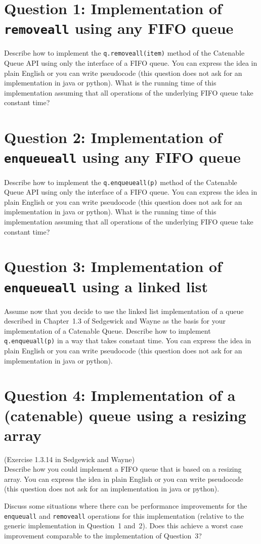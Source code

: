 \documentclass{tufte-handout}
\begin{document}
\section{\textbf{Question 1}: Implementation of \texttt{removeall} using any FIFO queue}

Describe how to implement the \texttt{q.removeall(item)} method of the Catenable Queue API using only the interface of a FIFO queue.
You can express the idea in plain English or you can write pseudocode (this question does not ask for an implementation in java or python).
What is the running time of this implementation assuming that all operations of the underlying FIFO queue take constant time?

\section{\textbf{Question 2}: Implementation of \texttt{enqueueall} using any FIFO queue}

Describe how to implement the \texttt{q.enqueueall(p)} method of the Catenable Queue API using only the interface of a FIFO queue.
You can express the idea in plain English or you can write pseudocode (this question does not ask for an implementation in java or python).
What is the running time of this implementation assuming that all operations of the underlying FIFO queue take constant time?

\section{\textbf{Question 3}: Implementation of \texttt{enqueueall} using a linked list}

Assume now that you decide to use the linked list implementation of a queue described in Chapter~1.3 of Sedgewick and Wayne as the basis for your implementation of a Catenable Queue.
Describe how to implement \texttt{q.enqueuall(p)} in a way that takes constant time.
You can express the idea in plain English or you can write pseudocode (this question does not ask for an implementation in java or python).

\section{\textbf{Question 4}: Implementation of a (catenable) queue using a resizing array}


(Exercise 1.3.14 in Sedgewick and Wayne)\\
Describe how you could implement a FIFO queue that is based on a resizing array.
You can express the idea in plain English or you can write pseudocode (this question does not ask for an implementation in java or python).

Discuss some situations where there can be performance improvements for the \texttt{enqueuall} and \texttt{removeall} operations for this implementation (relative to the generic implementation in Question~1 and~2).
Does this achieve a worst case improvement comparable to the implementation of Question~3?
\end{document}
